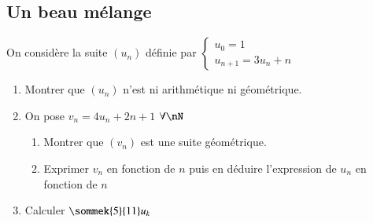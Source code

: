 \documentclass[oneside,12pt]{article}          %
\begin{document}
\subsection{Un beau mélange}
On considère la suite $(u_n)$ définie par $\begin{cases}u_0=1\\u_{n+1}=3u_n+n\end{cases}$
\begin{enumerate}
	\item Montrer que $(u_n)$ n'est ni arithmétique ni géométrique.
	\item On pose $v_n=4u_n+2n+1$ \quad $\forall\nN$
	\begin{enumerate}
		\item Montrer que $(v_n)$ est une suite géométrique.
		\item Exprimer $v_n$ en fonction de $n$ puis en déduire l'expression de $u_n$ en fonction de $n$
	\end{enumerate}
	\item Calculer $\sommek{5}{11}u_k$
\end{enumerate}
\end{document}
